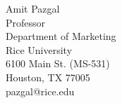 \begin{titlepage}
  Amit Pazgal\\
  Professor\\
  Department of Marketing\\
  Rice University\\
  6100 Main St. (MS-531)\\
  Houston, TX 77005\\
  pazgal@rice.edu\\




\vfill %

\end{titlepage}


\newpage